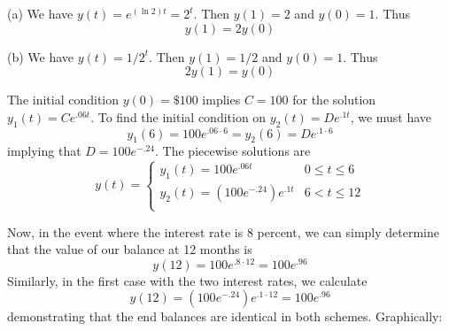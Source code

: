 \documentclass[a4paper]{article}
\begin{document}
\vspace{12pt}


\par (a) We have \(y \!\left( t \right) = e^{\!\left( \ln 2 \right) t} = 2^{t}\). Then \(y \!\left( 1 \right) = 2\) and \(y \!\left( 0 \right) = 1\). Thus 
\[
	y \!\left( 1 \right) = 2 y \!\left( 0 \right) 
\]
\par (b) We have \(y \!\left( t \right) = 1/2^{t}\). Then \(y \!\left( 1 \right) = 1/2\) and \(y \!\left( 0 \right) = 1\). Thus 
\[
	2 y \!\left( 1 \right) = y \!\left( 0 \right)
\]


The initial condition \(y \!\left( 0 \right) = \$100\) implies \(C = 100\) for the solution \(y_{1} \!\left( t \right) = Ce^{.06t}\). To find the initial condition on \(y_{2} \!\left( t \right) = De^{.1t}\), we must have
\[
	y_{1} \!\left( 6 \right) = 100e^{.06 \cdot 6} = y_{2} \!\left( 6 \right) = De^{.1 \cdot 6}
\]
implying that \(D = 100 e^{-.24}\). The piecewise solutions are
\[
	y \!\left( t \right) = \begin{cases}
		y_{1} \!\left( t \right) = 100e^{.06t}  & 0 \le t \le 6 \\
		y_{2} \!\left( t \right) = \!\left( 100e^{-.24} \right) e^{.1t} & 6 < t \le 12  \\
	\end{cases}
\]

Now, in the event where the interest rate is 8 percent, we can simply determine that the value of our balance at 12 months is
\[
	y \!\left( 12 \right) = 100e^{.8 \cdot 12} = 100e^{.96}
\]
Similarly, in the first case with the two interest rates, we calculate
\[
	y \!\left( 12 \right) = \!\left( 100e^{-.24} \right) e^{.1 \cdot 12} = 100e^{.96}
\]
demonstrating that the end balances are identical in both schemes. Graphically:
\end{document}
